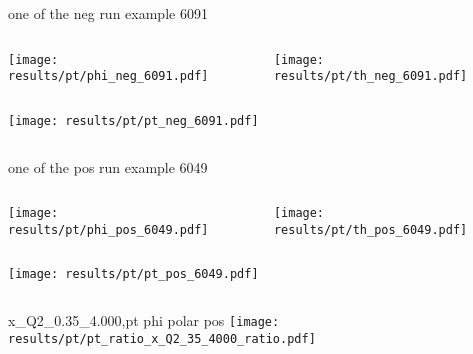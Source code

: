 \begin{frame}{one of the neg run example 6091}
\begin{columns}
\begin{column}[T]{0.5\textwidth}
\texttt{[image: results/pt/phi\_neg\_6091.pdf]}
\end{column}
\begin{column}[T]{0.5\textwidth}
\texttt{[image: results/pt/th\_neg\_6091.pdf]}
\end{column}
\end{columns}
\begin{columns}
\begin{column}[T]{0.5\textwidth}
\texttt{[image: results/pt/pt\_neg\_6091.pdf]}
\end{column}
\begin{column}[T]{0.5\textwidth}
\end{column}
\end{columns}
\end{frame}
\begin{frame}{one of the pos run example 6049}
\begin{columns}
\begin{column}[T]{0.5\textwidth}
\texttt{[image: results/pt/phi\_pos\_6049.pdf]}
\end{column}
\begin{column}[T]{0.5\textwidth}
\texttt{[image: results/pt/th\_pos\_6049.pdf]}
\end{column}
\end{columns}
\begin{columns}
\begin{column}[T]{0.5\textwidth}
\texttt{[image: results/pt/pt\_pos\_6049.pdf]}
\end{column}
\begin{column}[T]{0.5\textwidth}
\end{column}
\end{columns}
\end{frame}
\begin{frame}{x\_Q2\_0.35\_4.000,pt phi polar pos}
\texttt{[image: results/pt/pt\_ratio\_x\_Q2\_35\_4000\_ratio.pdf]}
\end{frame}
